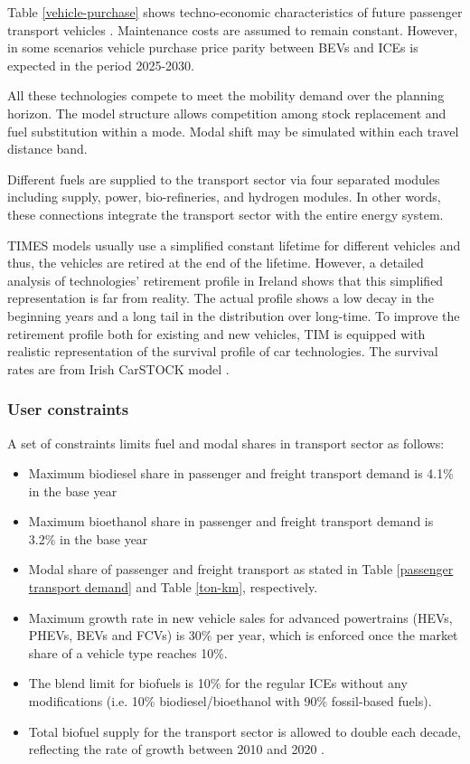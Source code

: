 \documentclass[gmd,manuscript]{copernicus}
\begin{document}
Table \ref{vehicle-purchase} shows techno-economic characteristics of future passenger transport vehicles \citep{Mulholland2017,Helgeson2020}. Maintenance costs are assumed to remain constant. However, in some scenarios vehicle purchase price parity between BEVs and ICEs is expected in the period 2025-2030. 

All these technologies compete to meet the mobility demand over the planning horizon. The model structure allows competition among stock replacement and fuel substitution within a mode. Modal shift may be simulated within each travel distance band. 

Different fuels are supplied to the transport sector via four separated modules including supply, power, bio-refineries, and hydrogen modules. In other words, these connections integrate the transport sector with the entire energy system.

TIMES models usually use a simplified constant lifetime for different vehicles and thus, the vehicles are retired at the end of the lifetime. However, a detailed analysis of technologies’ retirement profile in Ireland shows that this simplified representation is far from reality. The actual profile shows a low decay in the beginning years and a long tail in the distribution over long-time. To improve the retirement profile both for existing and new vehicles, TIM is equipped with realistic representation of the survival profile of car technologies. The survival rates are from Irish CarSTOCK model \citep{daly2011modelling, Mulholland2018}. 

\subsubsection{User constraints}

A set of constraints limits fuel and modal shares in transport sector as follows: 
\begin{itemize}
 \item Maximum biodiesel share in passenger and freight transport demand is 4.1\% in the base year
 \item Maximum bioethanol share in passenger and freight transport demand is 3.2\% in the base year
 \item Modal share of passenger and freight transport as stated in Table \ref{passenger transport demand} and Table \ref{ton-km}, respectively. 
 \item Maximum growth rate in new vehicle sales for advanced powertrains (HEVs, PHEVs, BEVs and FCVs) is 30\% per year, which is enforced once the market share of a vehicle type reaches 10\%.
 \item The blend limit for biofuels is 10\% for the regular ICEs without any modifications (i.e. 10\% biodiesel/bioethanol with 90\% fossil-based fuels). 
 \item Total biofuel supply for the transport sector is allowed to double each decade, reflecting the rate of growth between 2010 and 2020 \citep{NORA2019}. 
\end{itemize}
\end{document}
